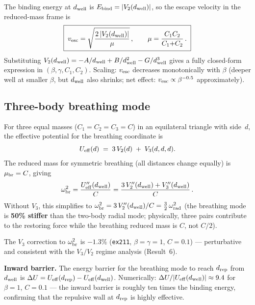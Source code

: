 \documentclass[11pt,a4paper]{article}
\newcommand{\drep}{d_{\rm rep}}
\newcommand{\dwell}{d_{\rm well}}
\begin{document}
The binding energy at $\dwell$ is $E_{\rm bind} = |V_2(\dwell)|$,
so the escape velocity in the reduced-mass frame is
\begin{equation}\label{eq:vesc}
\boxed{\;
  v_{\rm esc} = \sqrt{\frac{2\,|V_2(\dwell)|}{\mu}}\,,
  \qquad \mu = \frac{C_1 C_2}{C_1{+}C_2}\,.
\;}
\end{equation}
Substituting $V_2(\dwell) = -A/\dwell + B/\dwell^{2} - G/\dwell^{3}$
gives a fully closed-form expression in $(\beta,\gamma,C_1,C_2)$.
Scaling: $v_{\rm esc}$ decreases monotonically with $\beta$
(deeper well at smaller $\beta$, but $\dwell$ also shrinks;
net effect: $v_{\rm esc} \propto \beta^{-0.5}$ approximately).

\subsection{Three-body breathing mode}

For three equal masses ($C_1{=}C_2{=}C_3{=}C$) in an equilateral triangle
with side~$d$, the effective potential for the breathing coordinate is
\begin{equation}
  U_{\rm eff}(d) \;=\; 3\,V_2(d) \;+\; V_3(d,d,d).
\end{equation}
The reduced mass for symmetric breathing (all distances change equally) is
$\mu_{\rm br} = C$, giving
\begin{equation}\label{eq:omega-br}
  \omega^{2}_{\rm br} = \frac{U_{\rm eff}''(\dwell)}{C}
  = \frac{3\,V_2''(\dwell) + V_3''(\dwell)}{C}\,.
\end{equation}
Without $V_3$, this simplifies to
$\omega^{2}_{\rm br} = 3\,V_2''(\dwell)/C = \tfrac{3}{2}\,\omega^{2}_{\rm rad}$
(the breathing mode is \textbf{50\% stiffer} than the two-body radial mode;
physically, three pairs contribute to the restoring force while the breathing
reduced mass is $C$, not $C/2$).

The $V_3$ correction to $\omega^{2}_{\rm br}$ is \textbf{$-1.3\%$}
(\texttt{ex211}, $\beta{=}\gamma{=}1$, $C{=}0.1$) --- perturbative
and consistent with the $V_3/V_2$ regime analysis (Result~6).

\medskip
\noindent\textbf{Inward barrier.}
The energy barrier for the breathing mode to reach $\drep$ from $\dwell$ is
$\Delta U = U_{\rm eff}(\drep) - U_{\rm eff}(\dwell)$.
Numerically: $\Delta U / |U_{\rm eff}(\dwell)| \approx 9.4$
for $\beta{=}1$, $C{=}0.1$ --- the inward barrier is roughly ten times
the binding energy, confirming that the repulsive wall at $\drep$ is
highly effective.
\end{document}
